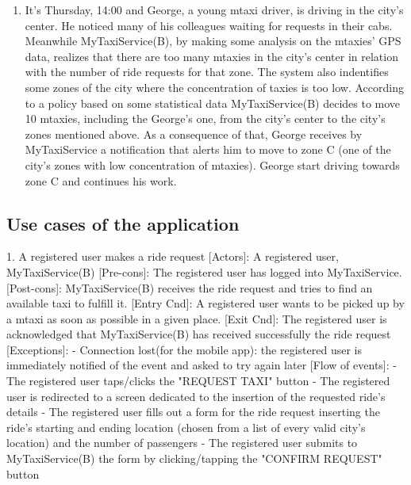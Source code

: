 \documentclass[11pt]{article} %
\begin{document}
\begin{enumerate}
	    \item It's Thursday, 14:00 and George, a young mtaxi driver, is driving in the city's center.
	       He noticed many of his colleagues waiting for requests in their cabs.
	       Meanwhile MyTaxiService(B), by making some analysis on the mtaxies' GPS data, realizes that there are too many mtaxies
	       in the city's center in relation with the number of ride requests for that zone. The system also indentifies
	       some zones of the city where the concentration of taxies is too low. According to a policy based on some statistical data
	       MyTaxiService(B) decides to move 10 mtaxies, including the George's one, from the city's center to the city's zones mentioned above.
	       As a consequence of that, George receives by MyTaxiService a notification that alerts him to move to zone C (one of the city's zones
	       with low concentration of mtaxies). George start driving towards zone C and continues his work.
	\end{enumerate}

    \subsection{Use cases of the application}

      1. A registered user makes a ride request
        [Actors]: A registered user, MyTaxiService(B)
        [Pre-cons]: The registered user has logged into MyTaxiService.
        [Post-cons]: MyTaxiService(B) receives the ride request and tries to find an available taxi to fulfill it.
        [Entry Cnd]: A registered user wants to be picked up by a mtaxi as soon as possible in a given place.
        [Exit Cnd]: The registered user is acknowledged that MyTaxiService(B) has received successfully the ride
        request
        [Exceptions]:
          - Connection lost(for the mobile app): the registered user is immediately notified of the event and
          asked to try again later
        [Flow of events]:
          - The registered user taps/clicks the "REQUEST TAXI" button
          - The registered user is redirected to a screen dedicated to the insertion
          of the requested ride's details
          - The registered user fills out a form for the ride request inserting the ride's starting and ending location
          (chosen from a list of every valid city's location) and the number of passengers
          - The registered user submits to MyTaxiService(B) the form by clicking/tapping the "CONFIRM REQUEST" button
\end{document}
